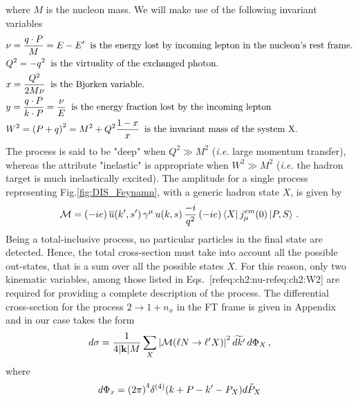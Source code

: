 where $M$ is the nucleon mass. We will make use of the following invariant variables
\begin{align}
        & \nu = \frac{q \cdot P}{M} = E - E' \;\; \textrm{is the energy lost by incoming lepton in the nucleon's rest frame.}
        \label{eq:ch2:nu}\\
        & Q^2 = - q^2 \;\; \textrm{is the virtuality of the exchanged photon.}
        \label{eq:ch2:Q2}\\
        & x=\frac{Q^2}{2M\nu} \;\; \textrm{is the Bjorken variable.}
        \label{eq:ch2:x}\\
        & y = \frac{q\cdot P}{k \cdot P} = \frac{\nu}{E} \; \; \textrm{is the energy fraction lost by the incoming lepton}
        \label{eq:ch2:y}\\
        & W^2 = \qty(P + q)^2 = M^2 + Q^2 \frac{1-x}{x} \;\; \textrm{is the invariant mass of the system X.}
        \label{eq:ch2:W2}
\end{align}
The process  is said to be "deep" when $Q^2 \gg M^2$ (\textit{i.e.} large momentum transfer), whereas the attribute "inelastic" is appropriate when $W^2 \gg M^2$ (\textit{i.e.} the hadron target is much inelastically excited). The amplitude for a single process representing Fig.\ref{fig:DIS_Feynamn}, with a generic hadron state $X$, is given by
\begin{equation}
    \mathcal{M} = (-i e) \, \overline{u}(k',s') \, \gamma^{\mu}\, u(k,s) \, \frac{-i}{q^2} \, (-i e)\bra{X} j_{\mu}^{em} \qty(0) \ket{P,S} \,.
    \label{eq:ch2:amplitude}
\end{equation}
Being a total-inclusive process, no particular particles in the final state are detected. Hence, the total cross-section must take into account all the possible out-states, that is a sum over all the possible states $X$. For this reason, only two kinematic variables, among those listed in Eqs.~[ref{eq:ch2:nu}-ref{eq:ch2:W2}] are required for providing a complete description of the process. The differential cross-section for the process $2 \rightarrow 1 + n_x$ in the FT frame is given in Appendix and in our case takes the form
\begin{equation}
    d\sigma = \frac{1}{4 \qty|\vb{k}| M} \sum_{X} \qty| \mathcal{M} \qty( \ell N \rightarrow \ell'X ) |^2 \, \widetilde{d k'} \,  d\Phi_X \, ,
    \label{eq:ch2:dsigma}
\end{equation}
where
\begin{equation}
        d \Phi_x = \qty(2\pi)^4 \delta^{(4)} \qty( k + P - k' - P_X ) \tilde{dP_X}  
\end{equation}
